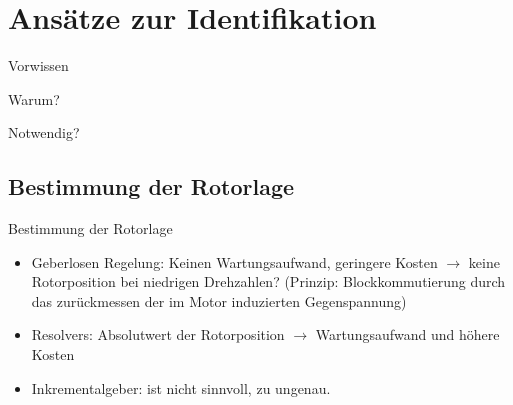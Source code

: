 \documentclass{beamer}
\begin{document}
\section{Ansätze zur Identifikation}
\begin{frame}{Vorwissen}
\begin{minipage}{0.4\textwidth}
	\large{Warum?}
\end{minipage}
\hfill
\begin{minipage}{0.4\textwidth}
	\large{Notwendig?}
\end{minipage}	
\end{frame}

\subsection{Bestimmung der Rotorlage}
\begin{frame}{Bestimmung der Rotorlage}
	\begin{itemize}
		\item Geberlosen Regelung: Keinen Wartungsaufwand, geringere Kosten $\rightarrow$ keine Rotorposition bei niedrigen Drehzahlen? (Prinzip: Blockkommutierung durch das zurückmessen der im Motor induzierten Gegenspannung)
		\item Resolvers: Absolutwert der Rotorposition $\rightarrow$ Wartungsaufwand und höhere Kosten
		\item Inkrementalgeber: ist nicht sinnvoll, zu ungenau.
	\end{itemize}
\end{frame}
\end{document}
